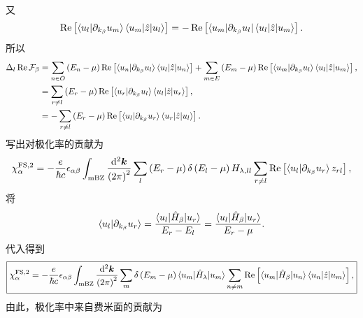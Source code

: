 \documentclass[10pt, oneside]{article}
\begin{document}
又
\begin{align}
	\operatorname{Re}\left[ \braket{u_{l} | \partial_{k_{\beta}} u_{m }} \braket{u_{m } | \hat{z} | u_{l}}\right] = - \operatorname{Re} \left[\bra{u_m | \partial_{k_{\beta}} u_{l}} \braket{u_{l} | \hat{z} | u_{m}}\right].
\end{align}
所以
\begin{align}
	\begin{split}
		\Delta_{l} \operatorname{Re} \mathcal{F}_{\beta} & = \sum_{n \in O} \left(E_n - \mu\right) \operatorname{Re} \left[\braket{u_n | \partial_{k_{\beta}} u_{l }} \braket{u_{l} | \hat{z} | u_{n}}\right] + \sum_{m \in E}  \left(E_m - \mu\right) \operatorname{Re} \left[\braket{u_m | \partial_{k_{\beta}} u_{l }} \braket{u_{l} | \hat{z} | u_{m}}\right], \\
		& = \sum_{r \neq l} \left(E_{r } - \mu\right) \operatorname{Re} \left[\braket{u_{r } | \partial_{k_{\beta}} u_{l }} \braket{u_{l} | \hat{z} | u_{r}}\right], \\
		& = - \sum_{r \neq l} \left(E_{r } - \mu\right) \operatorname{Re} \left[\braket{u_{l} | \partial_{k_{\beta}} u_{r}} \braket{u_{r} | \hat{z} | u_{l}}\right].
	\end{split}
\end{align}
写出对极化率的贡献为
\begin{align}
	\chi^{\mathrm{FS},2}_{\alpha} = - \frac{e }{\hbar c } \epsilon_{\alpha \beta} \int_{\mathrm{mBZ}} \frac{\mathrm{d}^{2} \bm{k}}{\left(2 \pi\right)^2} \sum_{l} \left(E_r - \mu\right) \delta \left(E_{l} - \mu\right) H_{\lambda,ll} \sum_{r \neq l}  \operatorname{Re} \left[\braket{u_{l} | \partial_{k_{\beta}} u_r} z_{rl}  \right],
\end{align}
将
\begin{align}
	\braket{u_{l} | \partial_{k_{\beta}} u_r} = \frac{\braket{u_l | \hat{H}_{\beta} | u_r }}{E_r - E_l} = \frac{\braket{u_l | \hat{H}_{\beta}| u_r}}{E_r - \mu}.
\end{align}
代入得到
\begin{align}
	\boxed{
		\chi^{\mathrm{FS},2}_{\alpha} = - \frac{e }{\hbar c } \epsilon_{\alpha \beta} \int_{\mathrm{mBZ}} \frac{\mathrm{d}^{2} \bm{k}}{\left(2 \pi\right)^2} \sum_{m} \delta \left(E_{m} - \mu\right) \braket{u_m | \hat{H}_{\lambda} | u_{m} } \sum_{n \neq m} \operatorname{Re} \left[\braket{u_{m} | \hat{H}_{\beta} | u_n} \braket{u_{n} | \hat{z} | u_{m}} \right],
	}
\end{align}
由此，极化率中来自费米面的贡献为
\end{document}
